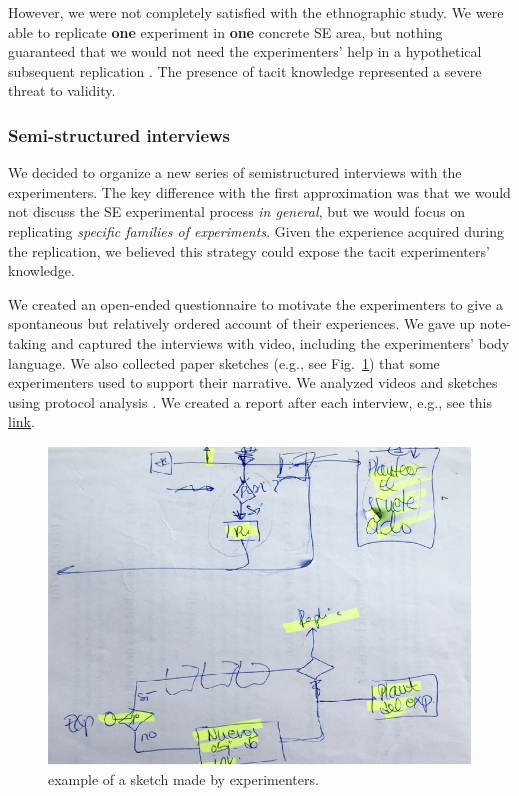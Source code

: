 However, we were not completely satisfied with the ethnographic study. We were able to replicate \textbf{one} experiment in \textbf{one} concrete SE area, but nothing guaranteed that we would not need the experimenters' help in a hypothetical subsequent replication \cite{Juristo-2012-replication-SE} \cite{Gomez-2014-understanding-replication}. The presence of tacit knowledge represented a severe threat to validity.

\subsubsection{Semi-structured interviews}
We decided to organize a new series of semistructured interviews with the experimenters. The key difference with the first approximation was that we would not discuss the SE experimental process \textit{in general}, but we would focus on replicating \textit{specific families of experiments}. Given the experience acquired during the replication, we believed this strategy could expose the tacit experimenters' knowledge.

We created an open-ended questionnaire to motivate the experimenters to give a spontaneous but relatively ordered account of their experiences. We gave up note-taking and captured the interviews with video, including the experimenters' body language. We also collected paper sketches (e.g., see Fig.~\ref{fig-proceso-exp-boseto}) that some experimenters used to support their narrative. We analyzed videos and sketches using protocol analysis \cite{Pressley-1995-verbal-protocols}. We created a report after each interview, e.g., see this \href{https://zenodo.org/record/7102137#.YytgDOzMLUI}{\ul{link}}.

\begin{figure}[htbp!]
	\centering
	\includegraphics[width=\columnwidth]{images/Boseto-Proccess}
	\caption{example of a sketch made by experimenters.}
	\label{fig-proceso-exp-boseto}
\end{figure}

